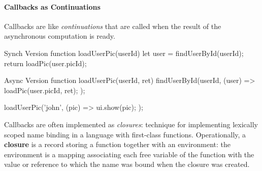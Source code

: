 \paragraph{Callbacks as Continuations}\label{par:rs_callbacks_as_continuations} %
Callbacks are like \textit{continuations} that are called when the result of the asynchronous computation is ready.
\begin{example}{}{}
    \begin{codeblock}[js]{Synch Version}
    function loadUserPic(userId) {
        let user = findUserById(userId);
        return loadPic(user.picId);
    }
    \end{codeblock}
    \begin{codeblock}[js]{Async Version}
    function loadUserPic(userId, ret) {
        findUserById(userId, (user) => {
            loadPic(user.picId, ret);
        });
    }

    loadUserPic('john', (pic) => {
        ui.show(pic);
    });
    \end{codeblock}
\end{example}
\begin{note}
    Callbacks are often implemented as \textit{closures}: technique for implementing lexically scoped name binding in a language with first-class functions.
    Operationally, a \textbf{closure} is a record storing a function together with an environment:  the environment is a mapping associating each free variable of the function with the value or reference to which the name was bound when the closure was created.
\end{note}
%
